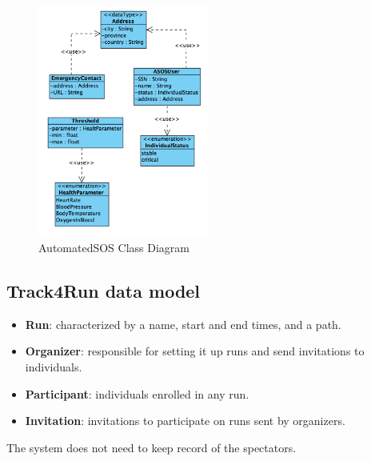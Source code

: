 \documentclass[a4paper, hidelinks, 12pt]{report}
\begin{document}
	\begin{figure}[H]
    		\centering
		\includegraphics[width=0.5\textwidth]{diagrams/asos_class_diagram.png}
		\caption[AutomatedSOS Class Diagram]{AutomatedSOS Class Diagram}
		\label{fig:AutomatedSOS Class Diagram}
	\end{figure}
	
	\subsection{Track4Run data model}
	\begin{itemize}
		\item{\textbf{Run}}:  characterized by a name, start and end times, and a path.
		\item{\textbf{Organizer}}: responsible for setting it up runs and send invitations to individuals.
		\item {\textbf{Participant}}: individuals enrolled in any run.
		\item {\textbf{Invitation}}: invitations to participate on runs sent by organizers.
	\end{itemize}
	
	The system does not need to keep record of the spectators. \\
	
\end{document}
